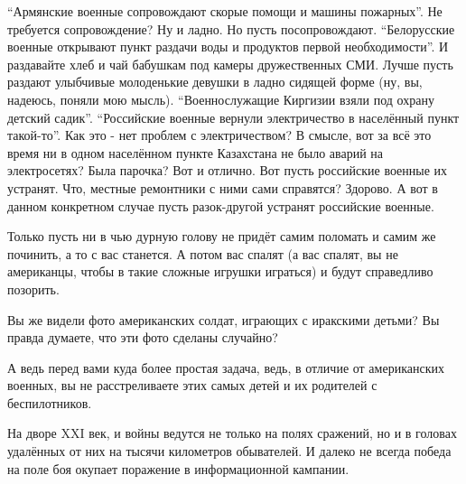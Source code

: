 \enquote{Армянские военные сопровождают скорые помощи и машины пожарных}. Не
требуется сопровождение? Ну и ладно. Но пусть посопровождают.
\enquote{Белорусские военные открывают пункт раздачи воды и продуктов первой
необходимости}. И раздавайте хлеб и чай бабушкам под камеры дружественных СМИ.
Лучше пусть раздают улыбчивые молоденькие девушки в ладно сидящей форме (ну,
вы, надеюсь, поняли мою мысль).  \enquote{Военнослужащие Киргизии взяли под
охрану детский садик}. \enquote{Российские военные вернули электричество в
населённый пункт такой-то}. Как это - нет проблем с электричеством? В смысле,
вот за всё это время ни в одном населённом пункте Казахстана не было аварий на
электросетях? Была парочка? Вот и отлично. Вот пусть российские военные их
устранят. Что, местные ремонтники с ними сами справятся? Здорово. А вот в
данном конкретном случае пусть разок-другой устранят российские военные.

Только пусть ни в чью дурную голову не придёт самим поломать и самим же
починить, а то с вас станется. А потом вас спалят (а вас спалят, вы не
американцы, чтобы в такие сложные игрушки играться) и будут справедливо
позорить.

Вы же видели фото американских солдат, играющих с иракскими детьми? Вы правда
думаете, что эти фото сделаны случайно? 

А ведь перед вами куда более простая задача, ведь, в отличие от американских
военных, вы не расстреливаете этих самых детей и их родителей с беспилотников.

На дворе XXI век, и войны ведутся не только на полях сражений, но и в головах
удалённых от них на тысячи километров обывателей. И далеко не всегда победа на
поле боя окупает поражение в информационной кампании.
